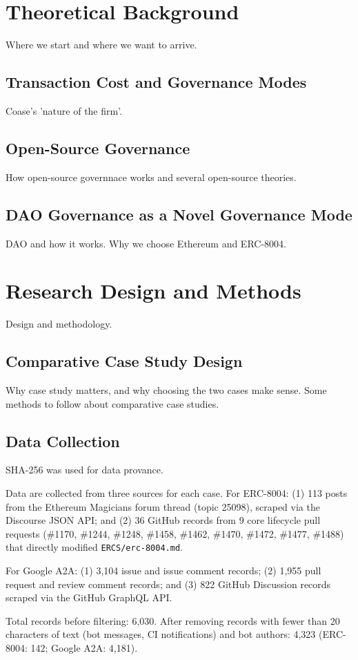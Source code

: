 \documentclass[conference]{IEEEtran}
\begin{document}
\section{Theoretical Background}
Where we start and where we want to arrive. 
\subsection{Transaction Cost and Governance Modes}
Coase's 'nature of the firm'.
\subsection{Open-Source Governance}
How open-source governnace works and several open-source theories.
\subsection{DAO Governance as a Novel Governance Mode}
DAO and how it works. Why we choose Ethereum and ERC-8004. 

\section{Research Design and Methods}
Design and methodology.
\subsection{Comparative Case Study Design}
Why case study matters, and why choosing the two cases make sense. Some methods to follow about comparative case studies.

\subsection{Data Collection}
SHA-256 was used for data provance. 

Data are collected from three sources for each case. For ERC-8004: (1) 113 posts from the Ethereum Magicians forum thread (topic 25098), scraped via the Discourse JSON API; and (2) 36 GitHub records from 9 core lifecycle pull requests (\#1170, \#1244, \#1248, \#1458, \#1462, \#1470, \#1472, \#1477, \#1488) that directly modified \texttt{ERCS/erc-8004.md}.

For Google A2A: (1) 3,104 issue and issue comment records; (2) 1,955 pull request and review comment records; and (3) 822 GitHub Discussion records scraped via the GitHub GraphQL API.

Total records before filtering: 6,030. After removing records with fewer than 20 characters of text (bot messages, CI notifications) and bot authors: 4,323 (ERC-8004: 142; Google A2A: 4,181).
\end{document}

